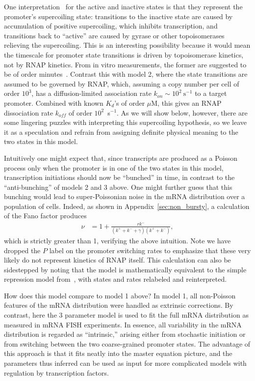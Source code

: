 One interpretation~\cite{Chong2014, Sevier2016} for the active and inactive
states is that they represent the promoter's supercoiling state: transitions to
the inactive state are caused by accumulation of positive supercoiling, which
inhibits transcription, and transitions back to ``active'' are caused by gyrase
or other topoisomerases relieving the supercoiling. This is an interesting
possibility because it would mean the timescale for promoter state transitions
is driven by topoisomerase kinetics, not by RNAP kinetics. From in vitro
measurements, the former are suggested to be of order minutes~\cite{Chong2014}.
Contrast this with model 2, where the state transitions are assumed to be
governed by RNAP, which, assuming a copy number per cell of order $10^3$, has a
diffusion-limited association rate $k_{on} \sim 10^2~\text{s}^{-1}$ to a target
promoter. Combined with known $K_d$'s of order $\mu$M, this gives an RNAP
dissociation rate $k_{off}$ of order $10^2$~s$^{-1}$. As we will show below,
however, there are some lingering puzzles with interpreting this supercoiling
hypothesis, so we leave it as a speculation and refrain from assigning definite
physical meaning to the two states in this model.

Intuitively one might expect that, since transcripts are produced as a Poisson
process only when the promoter is in one of the two states in this model,
transcription initiations should now be ``bunched'' in time, in contrast to the
``anti-bunching'' of models 2 and 3 above. One might further guess that this
bunching would lead to super-Poissonian noise in the mRNA distribution over a
population of cells.  Indeed, as shown in Appendix~\ref{sec:non_bursty}, a
calculation of the Fano factor produces
\begin{align}
\nu &= 1 + \frac{r k^-}{(k^+ + k^- + \gamma)(k^+ + k^-)},
\label{eq:model4_fano}
\end{align}
which is strictly greater than 1, verifying the above intuition. Note we have
dropped the $P$ label on the promoter switching rates to emphasize that these
very likely do not represent kinetics of RNAP itself. This calculation can also
be sidestepped by noting that the model is mathematically equivalent to the
simple repression model from~\cite{Jones2014}, with states and rates relabeled
and reinterpreted.

How does this model compare to model 1 above? In model 1, all non-Poisson
features of the mRNA distribution were handled as extrinsic corrections. By
contrast, here the 3 parameter model is used to fit the full mRNA distribution
as measured in mRNA FISH experiments. In essence, all variability in the mRNA
distribution is regarded as ``intrinsic,'' arising either from stochastic
initiation or from switching between the two coarse-grained promoter states. The
advantage of this approach is that it fits neatly into the master equation
picture, and the parameters thus inferred can be used as input for more
complicated models with regulation by transcription factors.

